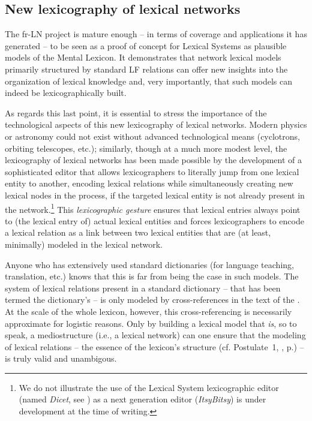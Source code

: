 \subsection{New lexicography of lexical networks}\label{sec:lexicographyOfLNs}

The fr-LN project is mature enough -- in terms of coverage and applications it has generated -- to be seen as a proof of concept for Lexical Systems as plausible models of the Mental Lexicon. It demonstrates that network lexical models primarily structured by standard LF relations can offer new insights into the organization of lexical knowledge and, very importantly, that such models can indeed be lexicographically built.

As regards this last point, it is essential to stress the importance of the technological aspects of this new lexicography of lexical networks. Modern physics or astronomy could not exist without advanced technological means (cyclotrons, orbiting telescopes, etc.); similarly, though at a much more modest level, the lexicography of lexical networks has been made possible by the development of a sophisticated editor that allows lexicographers to literally jump from one lexical entity to another, encoding lexical relations while simultaneously creating new lexical nodes in the process, if the targeted lexical entity is not already present in the network.\footnote{We do not illustrate the use of the Lexical System lexicographic editor (named \textit{Dicet}, see \cite{GaderEtAl2012}) as a next generation editor (\textit{ItsyBitsy}) is under development at the time of writing.} This \emph{lexicographic gesture} \parencite{Polguere2012e-e} ensures that lexical entries always point to (the lexical entry of) actual lexical entities and forces lexicographers to encode a lexical relation as a link between two lexical entities that are (at least, minimally) modeled in the lexical network.

Anyone who has extensively used standard dictionaries (for language teaching, translation, etc.) knows that this is far from being the case in such models. The system of lexical relations present in a standard dictionary -- that has been termed the dictionary's \label{txt:mediostructure} \parencite{Wiegand1996,GouwsPrinsloo1998} -- is only modeled by cross-references in the text of the . At the scale of the whole lexicon, however, this cross-referencing is necessarily approximate for logistic reasons. Only by building a lexical model that \emph{is}, so to speak, a mediostructure (i.e., a lexical network) can one ensure that the modeling of lexical relations -- the essence of the lexicon's structure (cf. Postulate~1, , p.\thinspace\pageref{txt:postulateStrucLexicons}) -- is truly valid and unambigous.

